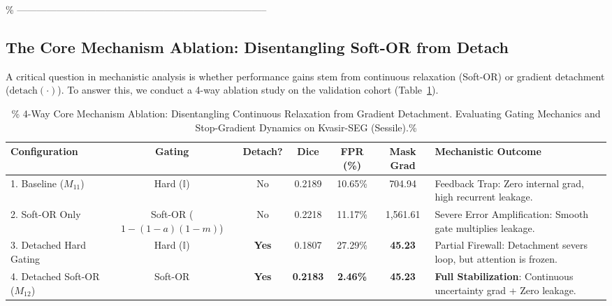 \% -----------------------------------------------------------------------------
\subsection{The Core Mechanism Ablation: Disentangling Soft-OR from Detach}
A critical question in mechanistic analysis is whether performance gains stem from
continuous relaxation (Soft-OR) or gradient detachment ($\text{detach}(\cdot)$).
To answer this, we conduct a 4-way ablation study on the validation cohort
(Table~\ref{tab:ablation_4way}).

\begin{table}[t!]
\centering
\caption{\%
  4-Way Core Mechanism Ablation: Disentangling Continuous Relaxation from Gradient Detachment.
  Evaluating Gating Mechanics and Stop-Gradient Dynamics on Kvasir-SEG (Sessile).\%
}
\label{tab:ablation_4way}
\begin{tabularx}{\textwidth}{p{3.2cm} c c c c c X}
\toprule
\textbf{Configuration}
  & \textbf{Gating}
  & \textbf{Detach?}
  & \textbf{Dice}
  & \textbf{FPR (\%)}
  & \textbf{Mask Grad}
  & \textbf{Mechanistic Outcome} \\
\midrule
1. Baseline ($M_{11}$)
  & Hard ($\mathbb{I}$)
  & No
  & 0.2189 & 10.65\% & 704.94
  & Feedback Trap: Zero internal grad, high recurrent leakage. \\
2. Soft-OR Only
  & Soft-OR ($1-(1-a)(1-m)$)
  & No
  & 0.2218 & 11.17\% & 1{,}561.61
  & Severe Error Amplification: Smooth gate multiplies leakage. \\
3. Detached Hard Gating
  & Hard ($\mathbb{I}$)
  & \textbf{Yes}
  & 0.1807 & 27.29\% & \textbf{45.23}
  & Partial Firewall: Detachment severs loop, but attention is frozen. \\
4. Detached Soft-OR ($M_{12}$)
  & Soft-OR
  & \textbf{Yes}
  & \textbf{0.2183} & \textbf{2.46\%} & \textbf{45.23}
  & \textbf{Full Stabilization}: Continuous uncertainty grad + Zero leakage. \\
\bottomrule
\end{tabularx}
\end{table}

